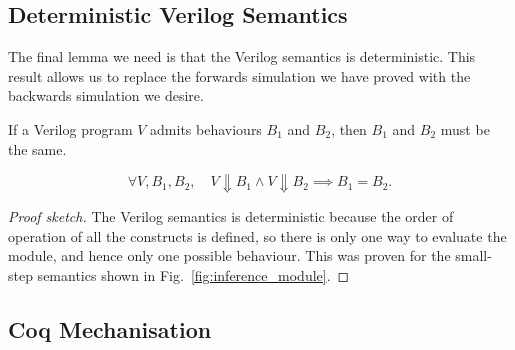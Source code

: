 \subsection{Deterministic Verilog Semantics}\label{sec:proof:deterministic}

The final lemma we need is that the Verilog semantics is deterministic. This result allows us to replace the forwards simulation we have proved with the backwards simulation we desire.

\begin{lemma}\label{lemma:deterministic}
  If a Verilog program $V$ admits behaviours $B_1$ and $B_2$, then $B_1$ and $B_2$ must be the same.

  \begin{equation*}
    \forall V, B_{1}, B_{2},\quad V \Downarrow B_{1} \land V \Downarrow B_{2} \implies B_{1} = B_{2}.
  \end{equation*}
\end{lemma}

\begin{proof}[Proof sketch]
  The Verilog semantics is deterministic because the order of operation of all the constructs is defined, so there is only one way to evaluate the module, and hence only one possible behaviour. This was proven for the small-step semantics shown in Fig.~\ref{fig:inference_module}.
\end{proof}



\subsection{Coq Mechanisation}

